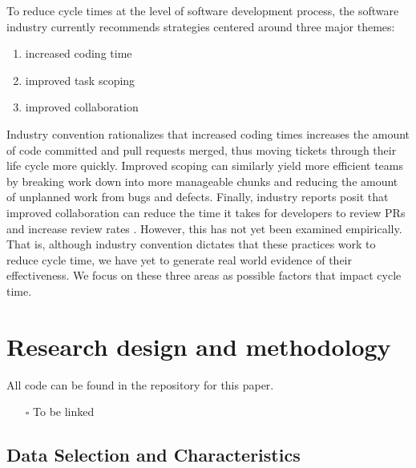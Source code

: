 \documentclass[manuscript,screen,review]{acmart}
\providecommand{\tightlist}{%
  \setlength{\itemsep}{0pt}\setlength{\parskip}{0pt}}\usepackage{longtable,booktabs,array}
\begin{document}
To reduce cycle times at the level of software development process, the
software industry currently recommends strategies centered around three
major themes:

\begin{enumerate}
\def\labelenumi{\arabic{enumi}.}
\tightlist
\item
  increased coding time
\item
  improved task scoping
\item
  improved collaboration
\end{enumerate}

Industry convention rationalizes that increased coding times increases
the amount of code committed and pull requests merged, thus moving
tickets through their life cycle more quickly. Improved scoping can
similarly yield more efficient teams by breaking work down into more
manageable chunks and reducing the amount of unplanned work from bugs
and defects. Finally, industry reports posit that improved collaboration
can reduce the time it takes for developers to review PRs and increase
review rates
\citep{flowHowIncreaseSoftware, gralhaReduceCycleTime2022, waydevCycleTimeFormula2021}.
However, this has not yet been examined empirically. That is, although
industry convention dictates that these practices work to reduce cycle
time, we have yet to generate real world evidence of their
effectiveness. We focus on these three areas as possible factors that
impact cycle time.

\section{Research design and
methodology}\label{research-design-and-methodology}

All code can be found in the repository for this paper.

\begin{itemize}
\tightlist
\item[$\square$]
  To be linked
\end{itemize}

\subsection{Data Selection and
Characteristics}\label{data-selection-and-characteristics}
\end{document}
